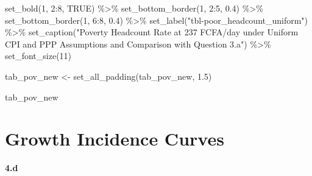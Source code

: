 \documentclass[
  letterpaper,
  DIV=11,
  numbers=noendperiod]{scrartcl}
\newenvironment{Shaded}{\begin{snugshade}}{\end{snugshade}}
\newcommand{\ConstantTok}[1]{\textcolor[rgb]{0.56,0.35,0.01}{#1}}
\newcommand{\DecValTok}[1]{\textcolor[rgb]{0.68,0.00,0.00}{#1}}
\newcommand{\FloatTok}[1]{\textcolor[rgb]{0.68,0.00,0.00}{#1}}
\newcommand{\FunctionTok}[1]{\textcolor[rgb]{0.28,0.35,0.67}{#1}}
\newcommand{\NormalTok}[1]{\textcolor[rgb]{0.00,0.23,0.31}{#1}}
\newcommand{\OtherTok}[1]{\textcolor[rgb]{0.00,0.23,0.31}{#1}}
\newcommand{\SpecialCharTok}[1]{\textcolor[rgb]{0.37,0.37,0.37}{#1}}
\newcommand{\StringTok}[1]{\textcolor[rgb]{0.13,0.47,0.30}{#1}}
\begin{document}
\begin{Shaded}
\begin{Highlighting}[]
  \FunctionTok{set\_bold}\NormalTok{(}\DecValTok{1}\NormalTok{, }\DecValTok{2}\SpecialCharTok{:}\DecValTok{8}\NormalTok{, }\ConstantTok{TRUE}\NormalTok{) }\SpecialCharTok{\%\textgreater{}\%}
  \FunctionTok{set\_bottom\_border}\NormalTok{(}\DecValTok{1}\NormalTok{, }\DecValTok{2}\SpecialCharTok{:}\DecValTok{5}\NormalTok{, }\FloatTok{0.4}\NormalTok{) }\SpecialCharTok{\%\textgreater{}\%}
  \FunctionTok{set\_bottom\_border}\NormalTok{(}\DecValTok{1}\NormalTok{, }\DecValTok{6}\SpecialCharTok{:}\DecValTok{8}\NormalTok{, }\FloatTok{0.4}\NormalTok{) }\SpecialCharTok{\%\textgreater{}\%}
  \FunctionTok{set\_label}\NormalTok{(}\StringTok{"tbl{-}poor\_headcount\_uniform"}\NormalTok{) }\SpecialCharTok{\%\textgreater{}\%}
  \FunctionTok{set\_caption}\NormalTok{(}\StringTok{"Poverty Headcount Rate at 237 FCFA/day under Uniform CPI and PPP Assumptions and Comparison with Question 3.a"}\NormalTok{) }\SpecialCharTok{\%\textgreater{}\%}
  \FunctionTok{set\_font\_size}\NormalTok{(}\DecValTok{11}\NormalTok{)}

\NormalTok{tab\_pov\_new }\OtherTok{\textless{}{-}} \FunctionTok{set\_all\_padding}\NormalTok{(tab\_pov\_new, }\FloatTok{1.5}\NormalTok{)}

\NormalTok{tab\_pov\_new}
\end{Highlighting}
\end{Shaded}

\section{Growth Incidence Curves}\label{growth-incidence-curves}

\textbf{4.d}
\end{document}
